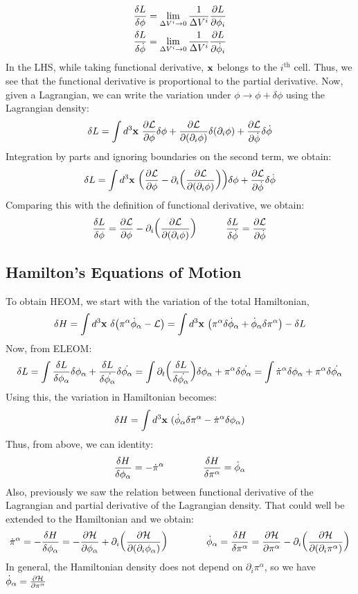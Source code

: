 \begin{align*}
    \frac{\delta L}{\delta \phi}&=\lim\limits_{\Delta V^i \rightarrow 0}\frac{1}{\Delta V^i}\pdv{L}{\phi_i}\\
    \frac{\delta L}{\delta \dot{\phi}}&=\lim\limits_{\Delta V^i \rightarrow 0}\frac{1}{\Delta V^i}\pdv{L}{\dot{\phi}_i}
\end{align*}
In the LHS, while taking functional derivative, $\vb{x}$ belongs to the $i^{\mathrm{th}}$ cell. Thus, we see that the functional derivative is proportional to the partial derivative. Now, given a Lagrangian, we can write the variation under $\phi\rightarrow \phi+\delta \phi$ using the Lagrangian density:
\begin{align*}
    \delta L = \int d^3\vb{x}\ \pdv{\mathcal L}{\phi}\delta\phi + \pdv{\mathcal L}{(\partial_i \phi)}\delta(\partial_i \phi) +\pdv{\mathcal L}{\dot{\phi}}\delta \dot{\phi} 
\end{align*}
Integration by parts and ignoring boundaries on the second term, we obtain:
\begin{align*}
    \delta L = \int d^3\vb{x}\ \qty(\pdv{\mathcal L}{\phi} - \partial_i \qty(\pdv{\mathcal L}{(\partial_i \phi)}))\delta\phi +\pdv{\mathcal L}{\dot{\phi}}\delta \dot{\phi} 
\end{align*}
Comparing this with the definition of functional derivative, we obtain:
$$\frac{\delta L}{\delta \phi} = \pdv{\mathcal L}{\phi} - \partial_i \qty(\pdv{\mathcal L}{(\partial_i \phi)})\qquad\quad \frac{\delta L}{\delta \dot{\phi}}=\pdv{\mathcal L}{\dot{\phi}}$$
\subsection{Hamilton's Equations of Motion}
To obtain HEOM, we start with the variation of the total Hamiltonian,
$$\delta H = \int d^3\vb{x} \ \delta\qty(\pi^\alpha\dot{\phi}_\alpha - \SL) =\int d^3\vb{x} \ \qty(\pi^\alpha \delta\dot{\phi}_\alpha +\dot{\phi}_\alpha\delta\pi^\alpha)-\delta L $$
Now, from ELEOM:
$$\delta L = \int \frac{\delta L}{\delta \phi_\alpha}\delta\phi_\alpha + \frac{\delta L}{\delta \dot{\phi_\alpha}}\delta\dot{\phi_\alpha} = \int \partial_t\qty(\frac{\delta L}{\delta \dot{\phi_\alpha}})\delta\phi_\alpha + \pi^\alpha \delta\dot{\phi_\alpha}= \int \dot{\pi}^\alpha\delta\phi_\alpha + \pi^\alpha \delta\dot{\phi_\alpha}$$
Using this, the variation in Hamiltonian becomes:
$$\delta H = \int d^3\vb{x}\ (\dot{\phi}_\alpha\delta\pi^\alpha - \dot{\pi}^\alpha\delta\phi_\alpha)$$
Thus, from above, we can identity:
$$\frac{\delta H}{\delta \phi_\alpha} = -\dot{\pi}^\alpha \qquad\qquad \frac{\delta H}{\delta \pi^\alpha} = \dot{\phi}_\alpha$$
Also, previously we saw the relation between functional derivative of the Lagrangian and partial derivative of the Lagrangian density. That could well be extended to the Hamiltonian and we obtain:
$$\dot{\pi}^\alpha = -\frac{\delta H}{\delta \phi_\alpha} = -\pdv{\mathcal H}{\phi_\alpha} + \partial_i \qty(\pdv{\mathcal H}{(\partial_i \phi_\alpha)})\qquad\qquad \dot{\phi}_\alpha = \frac{\delta H}{\delta \pi^\alpha} =\pdv{\mathcal H}{\pi^\alpha} -\partial_i \qty(\pdv{\mathcal H}{(\partial_i {\pi}^\alpha)})$$
In general, the Hamiltonian density does not depend on $\partial_i {\pi}^\alpha$, so we have $\dot{\phi}_\alpha=\pdv{\mathcal H}{\pi^\alpha}$
